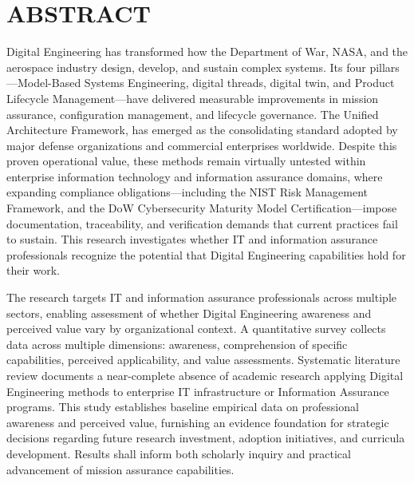 \chapter*{\Large \uppercase{Abstract}}\label{chap:Abstract}



Digital Engineering has transformed how the Department of War, NASA, and the aerospace industry design, develop, and sustain complex systems. Its four pillars---Model-Based Systems Engineering, digital threads, digital twin, and Product Lifecycle Management---have delivered measurable improvements in mission assurance, configuration management, and lifecycle governance. The Unified Architecture Framework, has emerged as the consolidating standard adopted by major defense organizations and commercial enterprises worldwide. Despite this proven operational value, these methods remain virtually untested within enterprise information technology and information assurance domains, where expanding compliance obligations---including the NIST Risk Management Framework, and the DoW Cybersecurity Maturity Model Certification---impose documentation, traceability, and verification demands that current practices fail to sustain. This research investigates whether IT and information assurance professionals recognize the potential that Digital Engineering capabilities hold for their work.

The research targets IT and information assurance professionals across multiple sectors, enabling assessment of whether Digital Engineering awareness and perceived value vary by organizational context. A quantitative survey collects data across multiple dimensions: awareness, comprehension of specific capabilities, perceived applicability, and value assessments. Systematic literature review documents a near-complete absence of academic research applying Digital Engineering methods to enterprise IT infrastructure or Information Assurance programs. This study establishes baseline empirical data on professional awareness and perceived value, furnishing an evidence foundation for strategic decisions regarding future research investment, adoption initiatives, and curricula development. Results shall inform both scholarly inquiry and practical advancement of mission assurance capabilities.

